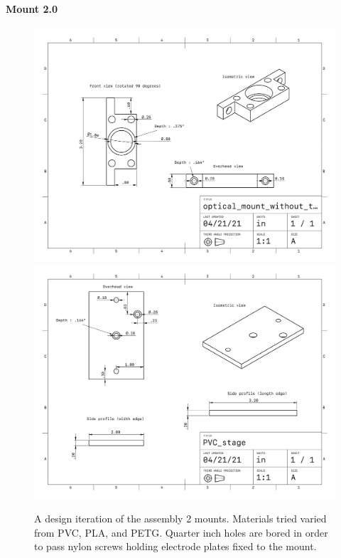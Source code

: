 \paragraph*{Mount 2.0}
\begin{figure}[H]
	\centering
	\begin{subcaptiongroup}
		\includegraphics[width=.76\textwidth]{figs/ALGAAS/assemblies/assembly2/assembly2_PVC_mount.pdf}
		\label{A2PVCmount}
		\includegraphics[width=.76\textwidth]{figs/ALGAAS/assemblies/assembly2/assembly2_PVC_stage.pdf}
		\label{A2PVCstage}
	\end{subcaptiongroup}
	\caption{A design iteration of the assembly 2 mounts. Materials tried varied from PVC, PLA, and PETG. Quarter inch holes are bored in order to pass nylon screws holding electrode plates fixed to the mount.}
	\label{fig:assembly2bp}
\end{figure}
\FloatBarrier

